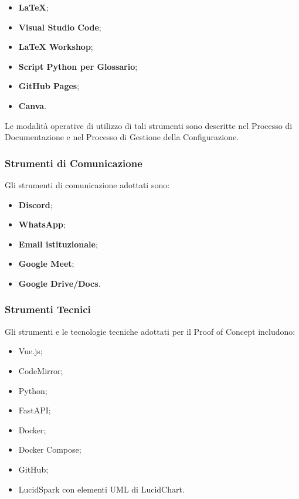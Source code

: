 \begin{itemize}
    \item \textbf{\LaTeX{}};
    \item \textbf{Visual Studio Code};
    \item \textbf{LaTeX Workshop};
    \item \textbf{Script Python per Glossario};
    \item \textbf{GitHub Pages};
    \item \textbf{Canva}.
\end{itemize}

Le modalità operative di utilizzo di tali strumenti sono descritte nel Processo
di Documentazione e nel Processo di Gestione della Configurazione.


\subsubsection{Strumenti di Comunicazione}

Gli strumenti di comunicazione adottati sono:

\begin{itemize}
    \item \textbf{Discord};
    \item \textbf{WhatsApp};
    \item \textbf{Email istituzionale};
    \item \textbf{Google Meet};
    \item \textbf{Google Drive/Docs}.
\end{itemize}


\subsubsection{Strumenti Tecnici}

Gli strumenti e le tecnologie tecniche adottati per il Proof of Concept includono:

\begin{itemize}
    \item Vue.js;
    \item CodeMirror;
    \item Python;
    \item FastAPI;
    \item Docker;
    \item Docker Compose;
    \item GitHub;
    \item LucidSpark con elementi UML di LucidChart.
\end{itemize}

